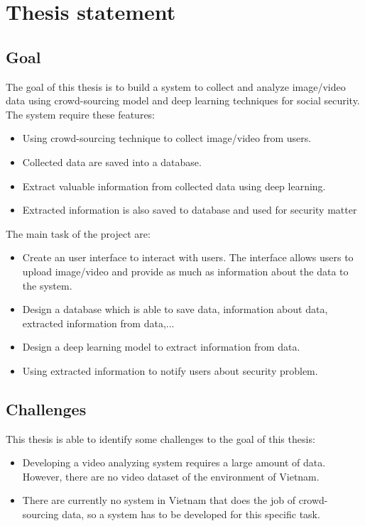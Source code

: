 \section{Thesis statement}
\subsection{Goal}
The goal of this thesis is to build a system to collect and analyze image/video data using crowd-sourcing model and deep learning techniques for social security. The system require these features:
\begin{itemize}
	\item Using crowd-sourcing technique to collect image/video from users.
	\item Collected data are saved into a database.
	\item Extract valuable information from collected data using deep learning.
	\item Extracted information is also saved to database and used for security matter
\end{itemize} 
The main task of the project are:
\begin{itemize}
	\item Create an user interface to interact with users. The interface allows users to upload image/video and provide as much as information about the data to the system.
	\item Design a database which is able to save data, information about data, extracted information from data,...
	\item Design a deep learning model to extract information from data.
	\item Using extracted information to notify users about security problem.
\end{itemize} 
\subsection{Challenges}
This thesis is able to identify some challenges to the goal of this thesis:
\begin{itemize}
	\item Developing a video analyzing system requires a large amount of data. However, there are no video dataset of the environment of Vietnam.
	\item There are currently no system in Vietnam that does the job of crowd-sourcing data, so a system has to be developed for this specific task.
\end{itemize}
